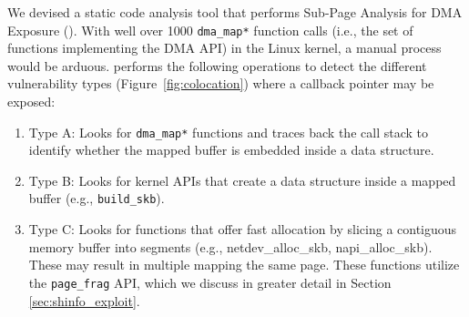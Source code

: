 We devised a static code analysis tool that performs Sub-Page Analysis for DMA Exposure (\tool). With well over 1000 \texttt{dma\_map*} function calls (i.e., the set of functions implementing the DMA API) in the Linux kernel, a manual process would be arduous. \tool performs the following operations to detect the different \subpage{} vulnerability types (Figure~\ref{fig:colocation}) where a callback pointer may be exposed:
\begin{enumerate}
    \item Type A: Looks for \texttt{dma\_map*} functions and traces back the call stack to identify whether the mapped buffer is embedded inside a data structure.
    \item Type B: Looks for kernel APIs that create a data structure inside a mapped buffer (e.g., \texttt{build\_skb}).
    \item Type C: Looks for functions that offer fast allocation by slicing a contiguous memory buffer into segments (e.g., netdev\_alloc\_skb, napi\_alloc\_skb). These may result in multiple \iova mapping the same page. These functions utilize the \texttt{page\_frag} API, which we discuss in greater detail in Section \ref{sec:shinfo_exploit}. 
\end{enumerate}




